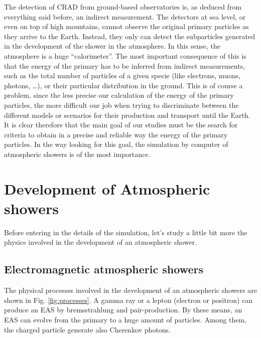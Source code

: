 The detection of CRAD from ground-based observatories is, as deduced
from everything said before, an indirect measurement. The detectors at
sea level, or even on top of high mountains, cannot observe the
original primary particles as they arrive to the Earth. Instead, they
only can detect the subparticles generated in the development of the
shower in the atmosphere. In this sense, the atmosphere is a huge
``calorimeter''. The most important consequence of this is that the
energy of the primary has to be inferred from indirect measurements,
such as the total number of particles of a given specie (like
electrons, muons, photons, \ldots), or their particular distribution
in the ground. This is of course a problem, since the less precise our
calculation of the energy of the primary particles, the more difficult
our job when trying to discriminate between the different models or
scenarios for their production and transport until the Earth.  It is
clear therefore that the main goal of our studies must be the search
for criteria to obtain in a precise and reliable way the energy of the
primary particles. In the way looking for this goal, the simulation by
computer of atmospheric showers is of the most importance.

\section{Development of Atmospheric showers} 

Before entering in the details of the simulation, let's study a little
bit more the physics involved in the development of an atmospheric
shower.

\subsection{Electromagnetic atmospheric showers}

\toymodelfig
%
The physical processes involved in the development of an atmospheric
showers are shown in Fig. \ref{fig:processes}. A gamma ray or a lepton
(electron or positron) can produce an EAS by bremsstrahlung and
pair-production. By these means, an EAS can evolve from the primary to
a huge amount of particles. Among them, the charged particle generate
also Cherenkov photons.

